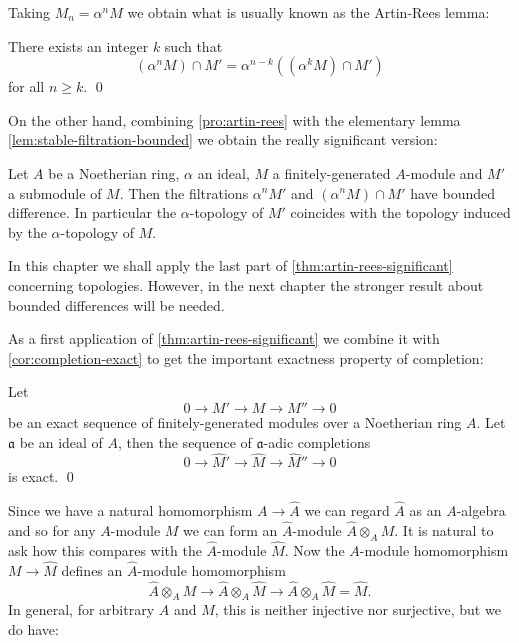 Taking $M_n = \alpha^n M$ we obtain what is usually known as the Artin-Rees lemma:

\begin{corollary}\label{cor:artin-rees}
    There exists an integer $k$ such that
    \[
    (\alpha^n M) \cap M' = \alpha^{n-k} ((\alpha^k M) \cap M')
    \]
    for all $n \ge k$.  \qed
\end{corollary}

On the other hand, combining \eqref{pro:artin-rees} with the elementary lemma \eqref{lem:stable-filtration-bounded} we obtain the really significant version:

\begin{theorem}\label{thm:artin-rees-significant}
    Let $A$ be a Noetherian ring, $\alpha$ an ideal, $M$ a finitely-generated $A$-module and $M'$ a submodule of $M$. Then the filtrations $\alpha^n M'$ and $(\alpha^n M) \cap M'$ have bounded difference. In particular the $\alpha$-topology of $M'$ coincides with the topology induced by the $\alpha$-topology of $M$. 
\end{theorem}

\begin{remark}
    In this chapter we shall apply the last part of \eqref{thm:artin-rees-significant} concerning topologies. However, in the next chapter the stronger result about bounded differences will be needed.
\end{remark}

As a first application of \eqref{thm:artin-rees-significant} we combine it with \eqref{cor:completion-exact} to get the important exactness property of completion:

\begin{proposition}\label{pro:completion-exact-sequence}
    Let
    \[
    0 \longrightarrow M' \longrightarrow M \longrightarrow M'' \longrightarrow 0
    \]
    be an exact sequence of finitely-generated modules over a Noetherian ring $A$. Let $\mathfrak{a}$ be an ideal of $A$, then the sequence of $\mathfrak{a}$-adic completions
    \[
    0 \longrightarrow \widehat{M}' \longrightarrow \widehat{M} \longrightarrow \widehat{M}'' \longrightarrow 0
    \]
    is exact. \qed
\end{proposition}

Since we have a natural homomorphism $A \to \widehat{A}$ we can regard $\widehat{A}$ as an $A$-algebra and so for any $A$-module $M$ we can form an $\widehat{A}$-module $\widehat{A} \otimes_A M$. It is natural to ask how this compares with the $\widehat{A}$-module $\widehat{M}$. Now the $A$-module homomorphism $M \to \widehat{M}$ defines an $\widehat{A}$-module homomorphism
\[
\widehat{A} \otimes_A M \longrightarrow \widehat{A} \otimes_A \widehat{M} \longrightarrow \widehat{A} \otimes_A \widehat{M} = \widehat{M}.
\]
In general, for arbitrary $A$ and $M$, this is neither injective nor surjective, but we do have:


